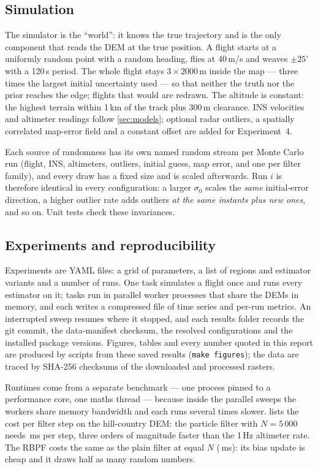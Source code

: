 \subsection{Simulation}\label{sec:sim}
The simulator is the ``world'': it knows the true trajectory and is the only component that
reads the DEM at the true position. A flight starts at a uniformly random point with a random
heading, flies at 40\,m/s and weaves $\pm25^\circ$ with a 120\,s period. The whole flight stays
$3\times2000$\,m inside the map --- three times the largest initial uncertainty used --- so that
neither the truth nor the prior reaches the edge; flights that would are redrawn. The altitude is
constant: the highest terrain within 1\,km of the track plus 300\,m clearance. INS velocities
and altimeter readings follow \cref{sec:models}; optional radar outliers, a spatially correlated
map-error field and a constant offset are added for Experiment~4.

Each source of randomness has its own named random stream per Monte Carlo run (flight, INS,
altimeters, outliers, initial guess, map error, and one per filter family), and every draw has a
fixed size and is scaled afterwards. Run $i$ is therefore identical in every configuration: a
larger $\sigma_0$ scales the \emph{same} initial-error direction, a higher outlier rate adds
outliers \emph{at the same instants plus new ones}, and so on. Unit tests check these invariances.

\subsection{Experiments and reproducibility}
Experiments are YAML files: a grid of parameters, a list of regions and estimator variants and a
number of runs. One task simulates a flight once and runs every estimator on it; tasks run in
parallel worker processes that share the DEMs in memory, and each writes a compressed file of
time series and per-run metrics. An interrupted sweep resumes where it stopped, and each results
folder records the git commit, the data-manifest checksum, the resolved configurations and the
installed package versions. Figures, tables and every number quoted in this report are produced
by scripts from these saved results (\texttt{make figures}); the data are traced by SHA-256
checksums of the downloaded and processed rasters.

Runtimes come from a separate benchmark --- one process pinned to a performance core, one maths
thread --- because inside the parallel sweeps the workers share memory bandwidth and each runs
several times slower.  lists the cost per filter step on the hill-country DEM:
the particle filter with $N = 5\,000$ needs \RtPfFiveZeroZeroZero{}\,ms per step, three orders
of magnitude faster than the 1\,Hz altimeter rate. The RBPF costs the same as the plain filter
at equal $N$ (\RtRbpfFiveZeroZeroZero{}\,ms): its bias update is cheap and it draws half as many
random numbers.

